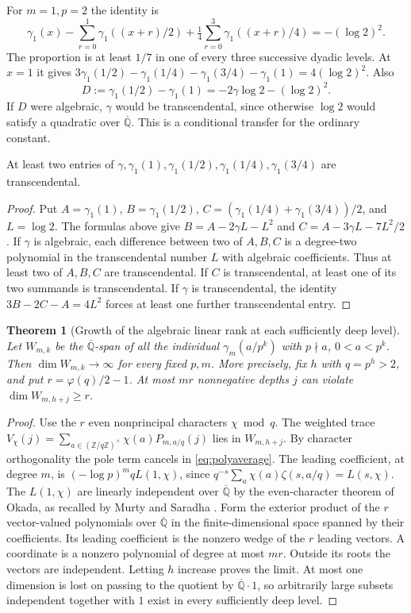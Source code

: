 \documentclass[11pt,a4paper]{article}
\newtheorem{theorem}{Theorem}[section]
\theoremstyle{definition}\newtheorem{definition}[theorem]{Definition}\newtheorem{example}[theorem]{Example}
\theoremstyle{remark}\newtheorem{remark}[theorem]{Remark}
\newcommand{\Q}{\mathbb Q}\newcommand{\Z}{\mathbb Z}\newcommand{\R}{\mathbb R}\newcommand{\N}{\mathbb N}
\begin{document}
For $m=1,p=2$ the identity is
\[
\gamma_1(x)-\sum_{r=0}^{1}\gamma_1((x+r)/2)+\tfrac14\sum_{r=0}^{3}\gamma_1((x+r)/4)=-(\log2)^2.
\]
The proportion is at least $1/7$ in one of every three successive dyadic levels. At $x=1$ it gives $3\gamma_1(1/2)-\gamma_1(1/4)-\gamma_1(3/4)-\gamma_1(1)=4(\log2)^2$.
Also
\begin{equation}\label{eq:Dhalf}
D:=\gamma_1(1/2)-\gamma_1(1)=-2\gamma\log2-(\log2)^2.
\end{equation}
If $D$ were algebraic, $\gamma$ would be transcendental, since otherwise $\log 2$ would satisfy a quadratic over $\overline{\Q}$. This is a conditional transfer for the ordinary constant.

\begin{corollary}
At least two entries of $\gamma,\gamma_1(1),\gamma_1(1/2),\gamma_1(1/4),\gamma_1(3/4)$ are transcendental.
\end{corollary}
\begin{proof}
Put $A=\gamma_1(1)$, $B=\gamma_1(1/2)$, $C=(\gamma_1(1/4)+\gamma_1(3/4))/2$, and $L=\log2$. The formulas above give $B=A-2\gamma L-L^2$ and $C=A-3\gamma L-7L^2/2$. If $\gamma$ is algebraic, each difference between two of $A,B,C$ is a degree-two polynomial in the transcendental number $L$ with algebraic coefficients. Thus at least two of $A,B,C$ are transcendental. If $C$ is transcendental, at least one of its two summands is transcendental. If $\gamma$ is transcendental, the identity $3B-2C-A=4L^2$ forces at least one further transcendental entry.
\end{proof}
\begin{theorem}[Growth of the algebraic linear rank at each sufficiently deep level]\label{thm:rankdeep}
Let $W_{m,k}$ be the $\overline{\Q}$-span of all the individual $\gamma_m(a/p^k)$ with $p\nmid a$, $0<a<p^k$. Then $\dim W_{m,k}\longrightarrow\infty$ for every fixed $p,m$. More precisely, fix $h$ with $q=p^h>2$, and put $r=\varphi(q)/2-1$. At most $mr$ nonnegative depths $j$ can violate $\dim W_{m,h+j}\ge r$.
\end{theorem}
\begin{proof}
Use the $r$ even nonprincipal characters $\chi\bmod q$. The weighted trace $V_\chi(j)=\sum_{a\in(\Z/q\Z)^\times}\chi(a)P_{m,a/q}(j)$ lies in $W_{m,h+j}$. By character orthogonality the pole term cancels in \eqref{eq:polyaverage}. The leading coefficient, at degree $m$, is $(-\log p)^m q L(1,\chi)$, since $q^{-s}\sum_a\chi(a)\zeta(s,a/q)=L(s,\chi)$. The $L(1,\chi)$ are linearly independent over $\overline{\Q}$ by the even-character theorem of Okada, as recalled by Murty and Saradha \cite[p.~354]{MurtySaradha}. Form the exterior product of the $r$ vector-valued polynomials over $\overline{\Q}$ in the finite-dimensional space spanned by their coefficients. Its leading coefficient is the nonzero wedge of the $r$ leading vectors. A coordinate is a nonzero polynomial of degree at most $mr$. Outside its roots the vectors are independent. Letting $h$ increase proves the limit. At most one dimension is lost on passing to the quotient by $\overline{\Q}\cdot1$, so arbitrarily large subsets independent together with $1$ exist in every sufficiently deep level.
\end{proof}
\end{document}
